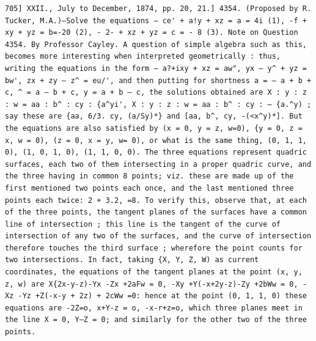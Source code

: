 \documentclass[11pt,a4paper]{book}
\begin{document}
\newpage
\setcounter{page}{581}
\begin{verbatim}
705] XXII., July to December, 1874, pp. 20, 21.] 4354. (Proposed by R. Tucker, M.A.)—Solve the equations — ce' + a!y + xz = a = 4i (1), -f + xy + yz = b=-20 (2), - 2- + xz + yz = c = - 8 (3). Note on Question 4354. By Professor Cayley. A question of simple algebra such as this, becomes more interesting when interpreted geometrically : thus, writing the equations in the form — a?+ixy + xz = aw", yx — y^ + yz = bw', zx + zy — z^ = eu/', and then putting for shortness a = — a + b + c, ^ = a — b + c, y = a + b — c, the solutions obtained are X : y : z : w = aa : b^ : cy : {a^yi', X : y : z : w = aa : b^ : cy : — {a.^y) ; say these are {aa, 6/3. cy, (a/Sy)*} and [aa, b^, cy, -(<x^y)*]. But the equations are also satisfied by (x = 0, y = z, w=0), {y = 0, z = x, w = 0), (z = 0, x = y, w= 0), or what is the same thing, (0, 1, 1, 0), (1, 0, 1, 0), (1, 1, 0, 0). The three equations represent quadric surfaces, each two of them intersecting in a proper quadric curve, and the three having in common 8 points; viz. these are made up of the first mentioned two points each once, and the last mentioned three points each twice: 2 + 3.2, =8. To verify this, observe that, at each of the three points, the tangent planes of the surfaces have a common line of intersection ; this line is the tangent of the curve of intersection of any two of the surfaces, and the curve of intersection therefore touches the third surface ; wherefore the point counts for two intersections. In fact, taking {X, Y, Z, W) as current coordinates, the equations of the tangent planes at the point (x, y, z, w) are X{2x-y-z)-Yx -Zx +2aFw = 0, -Xy +Y(-x+2y-z)-Zy +2bWw = 0, -Xz -Yz +Z(-x-y + 2z) + 2cWw =0: hence at the point (0, 1, 1, 0) these equations are -2Z=o, x+Y-z = o, -x-r+z=o, which three planes meet in the line X = 0, Y—Z = 0; and similarly for the other two of the three points. 
\end{verbatim}
\end{document}
